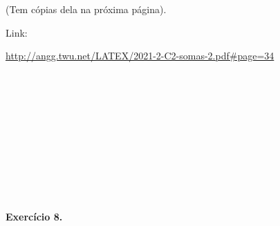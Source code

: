 \documentclass[oneside,12pt]{article}
\begin{document}
(Tem cópias dela na próxima página).

\msk

Link:

{\footnotesize

\url{http://angg.twu.net/LATEX/2021-2-C2-somas-2.pdf\#page=34}

}

\ssk


\newpage


\pu
%
\def\FOO{\scalebox{0.5}{$\ga{FOO}$}}
\def\FOO{\ga{FOO}}


\vspace*{-0.25cm}
\hspace*{-0.5cm}
$\scalebox{0.40}{$
 \begin{array}{ccccccc}
 \FOO && \FOO && \FOO && \FOO \\[70pt]
 \FOO && \FOO && \FOO && \FOO \\[70pt]
 \FOO && \FOO && \FOO && \FOO \\[70pt]
 \FOO && \FOO && \FOO && \FOO \\[70pt]
 \end{array}
 $}
$



\newpage


{\bf Exercício 8.}

\def\mname#1{\text{[#1]}}

\pu
%
\def\EB{\scalebox{0.6}{$\ga{Exercicio 8 bare}$}}
\def\EC{\scalebox{0.6}{$\ga{Exercicio 8}$}}
\end{document}
